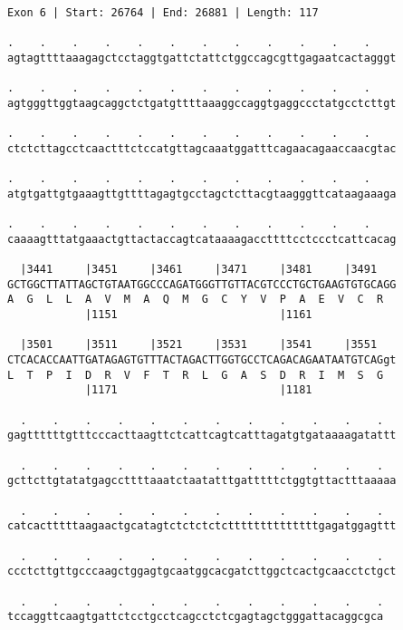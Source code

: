 \documentclass{article}
\begin{document}
\newpage
\begin{Verbatim}
Exon 6 | Start: 26764 | End: 26881 | Length: 117
 
.    .    .    .    .    .    .    .    .    .    .    .    
agtagttttaaagagctcctaggtgattctattctggccagcgttgagaatcactagggt
  
.    .    .    .    .    .    .    .    .    .    .    .    
agtgggttggtaagcaggctctgatgttttaaaggccaggtgaggccctatgcctcttgt
  
.    .    .    .    .    .    .    .    .    .    .    .    
ctctcttagcctcaactttctccatgttagcaaatggatttcagaacagaaccaacgtac
  
.    .    .    .    .    .    .    .    .    .    .    .    
atgtgattgtgaaagttgttttagagtgcctagctcttacgtaagggttcataagaaaga
  
.    .    .    .    .    .    .    .    .    .    .    .    
caaaagtttatgaaactgttactaccagtcataaaagaccttttcctccctcattcacag
  
  |3441     |3451     |3461     |3471     |3481     |3491   
GCTGGCTTATTAGCTGTAATGGCCCAGATGGGTTGTTACGTCCCTGCTGAAGTGTGCAGG
A  G  L  L  A  V  M  A  Q  M  G  C  Y  V  P  A  E  V  C  R  
            |1151                         |1161             
  
  |3501     |3511     |3521     |3531     |3541     |3551   
CTCACACCAATTGATAGAGTGTTTACTAGACTTGGTGCCTCAGACAGAATAATGTCAGgt
L  T  P  I  D  R  V  F  T  R  L  G  A  S  D  R  I  M  S  G  
            |1171                         |1181             
  
  .    .    .    .    .    .    .    .    .    .    .    .  
gagttttttgtttcccacttaagttctcattcagtcatttagatgtgataaaagatattt
  
  .    .    .    .    .    .    .    .    .    .    .    .  
gcttcttgtatatgagccttttaaatctaatatttgatttttctggtgttactttaaaaa
  
  .    .    .    .    .    .    .    .    .    .    .    .  
catcactttttaagaactgcatagtctctctctcttttttttttttttgagatggagttt
  
  .    .    .    .    .    .    .    .    .    .    .    .  
ccctcttgttgcccaagctggagtgcaatggcacgatcttggctcactgcaacctctgct
  
  .    .    .    .    .    .    .    .    .    .    .    .
tccaggttcaagtgattctcctgcctcagcctctcgagtagctgggattacaggcgca
\end{Verbatim}
\newpage
\end{document}
